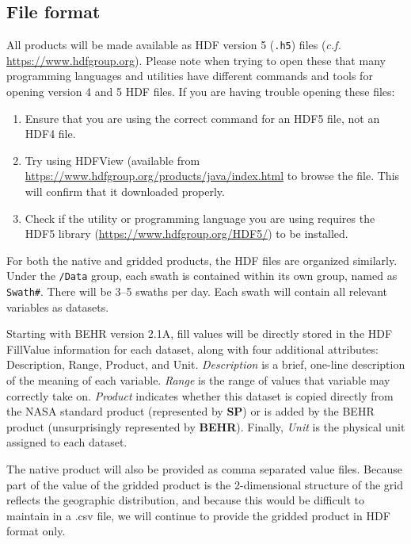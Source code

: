 \documentclass[12pt]{article}
\begin{document}
	\subsection{File format}
	All products will be made available as HDF version 5 (\texttt{.h5}) files (\emph{c.f.} \url{https://www.hdfgroup.org}).  Please note when trying to open these that many programming languages and utilities have different commands and tools for opening version 4 and 5 HDF files. If you are having trouble opening these files:
	\begin{enumerate}
		\item Ensure that you are using the correct command for an HDF5 file, not an HDF4 file.
		\item Try using HDFView (available from \url{https://www.hdfgroup.org/products/java/index.html} to browse the file. This will confirm that it downloaded properly.
		\item Check if the utility or programming language you are using requires the HDF5 library (\url{https://www.hdfgroup.org/HDF5/}) to be installed. 
	\end{enumerate}
	
	For both the native and gridded products, the HDF files are organized similarly. Under the \texttt{/Data} group, each swath is contained within its own group, named as \texttt{Swath\#}. There will be 3--5 swaths per day. Each swath will contain all relevant variables as datasets.
	
	Starting with BEHR version 2.1A, fill values will be directly stored in the HDF FillValue information for each dataset, along with four additional attributes: Description, Range, Product, and Unit.  \emph{Description} is a brief, one-line description of the meaning of each variable. \emph{Range} is the range of values that variable may correctly take on. \emph{Product} indicates whether this dataset is copied directly from the NASA standard product (represented by \textbf{SP}) or is added by the BEHR product (unsurprisingly represented by \textbf{BEHR}). Finally, \emph{Unit} is the physical unit assigned to each dataset. 
	
	The native product will also be provided as comma separated value files. Because part of the value of the gridded product is the 2-dimensional structure of the grid reflects the geographic distribution, and because this would be difficult to maintain in a .csv file, we will continue to provide the gridded product in HDF format only.
	
\end{document}
